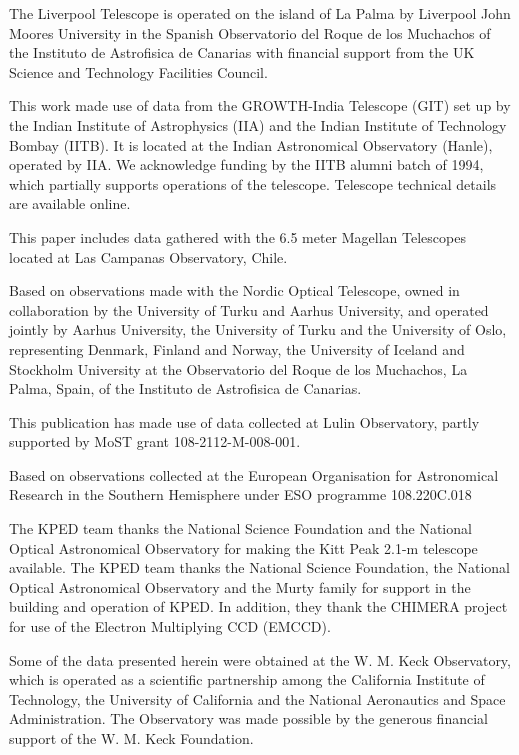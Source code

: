 \documentclass{nature_plusfigure}
\begin{document}
\begin{addendum}
The Liverpool Telescope is operated on the island of La Palma by Liverpool John Moores University in the Spanish Observatorio del Roque de los Muchachos of the Instituto de Astrofisica de Canarias with financial support from the UK Science and Technology Facilities Council.

This work made use of data from the GROWTH-India Telescope (GIT) set up by the Indian Institute of Astrophysics (IIA) and the Indian Institute of Technology Bombay (IITB). It is located at the Indian Astronomical Observatory (Hanle), operated by IIA. We acknowledge funding by the IITB alumni batch of 1994, which partially supports operations of the telescope. Telescope technical details are available online.\cite{growth_india}

This paper includes data gathered with the 6.5 meter Magellan Telescopes located at Las Campanas Observatory, Chile.

Based on observations made with the Nordic Optical Telescope, owned in collaboration by the University of Turku and Aarhus University, and operated jointly by Aarhus University, the University of Turku and the University of Oslo, representing Denmark, Finland and Norway, the University of Iceland and Stockholm University at the Observatorio del Roque de los Muchachos, La Palma, Spain, of the Instituto de Astrofisica de Canarias.

This publication has made use of data collected at Lulin Observatory, partly supported by MoST grant 108-2112-M-008-001.

Based on observations collected at the European Organisation for Astronomical Research in the Southern Hemisphere under ESO programme 108.220C.018

The KPED team thanks the National Science Foundation and the National Optical Astronomical Observatory for making the Kitt Peak 2.1-m telescope available. The KPED team thanks the National Science Foundation, the National Optical Astronomical Observatory and the Murty family for support in the building and operation of KPED. In addition, they thank the CHIMERA project for use of the Electron Multiplying CCD (EMCCD).

Some of the data presented herein were obtained at the W. M. Keck Observatory, which is operated as a scientific partnership among the California Institute of Technology, the University of California and the National Aeronautics and Space Administration. The Observatory was made possible by the generous financial support of the W. M. Keck Foundation.


\end{addendum}
\end{document}
